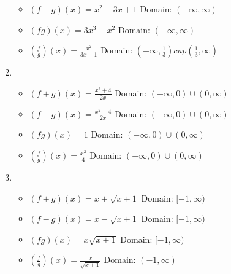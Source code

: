 \documentclass{article}
\begin{document}
\begin{enumerate}
\begin{itemize}
        \item $(f-g)(x)=x^2-3x+1$ \quad Domain: $(-\infty, \infty)$
        \item $(fg)(x)=3x^3-x^2$ \quad Domain: $(-\infty, \infty)$
        \item $\left(\frac{f}{g}\right)(x)=\frac{x^2}{3x-1}$ \quad Domain: $\left(-\infty,\frac{1}{3}\right) cup \left(\frac{1}{3},\infty\right)$
    \end{itemize}
    \item
    \begin{itemize}
        \item $(f+g)(x)=\frac{x^2+4}{2x}$ \quad Domain: $(-\infty, 0) \cup (0,\infty)$
        \item $(f-g)(x)=\frac{x^2-4}{2x}$ \quad Domain: $(-\infty, 0) \cup (0,\infty)$
        \item $(fg)(x)=1$ \quad Domain: $(-\infty, 0) \cup (0,\infty)$
        \item $\left(\frac{f}{g}\right)(x)=\frac{x^2}{4}$ \quad Domain: $(-\infty, 0) \cup (0,\infty)$
    \end{itemize}
    \item
    \begin{itemize}
        \item $(f+g)(x)=x+\sqrt{x+1}$ \quad Domain: $[-1,\infty)$
        \item $(f-g)(x)=x-\sqrt{x+1}$ \quad Domain: $[-1,\infty)$
        \item $(fg)(x)=x\sqrt{x+1}$ \quad Domain: $[-1,\infty)$
        \item $\left(\frac{f}{g}\right)(x)=\frac{x}{\sqrt{x+1}}$ \quad Domain: $(-1,\infty)$
    \end{itemize}
\vspace{0.25in}
\end{enumerate}
\end{document}
